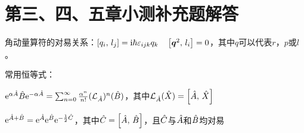 \section{第三、四、五章小测补充题解答}

角动量算符的对易关系：$\zkh{q_i,\,l_j}=\ihb\eijk q_k\quad\zkh{\vec{q}^2,\,l_i}=0$，其中$q$可以代表$r$，$p$或$l$。

常用恒等式：

$\ee{\alpha\hA}\hB\ee{-\alpha\hA}=\sum_{n=0}^\infty\frac{\alpha^n}{n!}(\mathcal{L}_{\hA})^n(\hB)$，其中$\mathcal{L}_{\hA}(\hX)=\zkh{\hA,\,\hX}$

$\ee{\hA+\hB}=\ee{\hA}\ee{\hB}\ee{-\frac{1}{2}\hC}$，其中$\hC=\zkh{\hA,\,\hB}$，且$\hC$与$\hA$和$\hB$均对易

